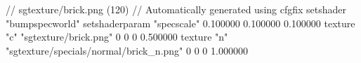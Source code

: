 // sgtexture/brick.png (120)
// Automatically generated using cfgfix
setshader "bumpspecworld"
setshaderparam "specscale" 0.100000 0.100000 0.100000
texture "c" "sgtexture/brick.png" 0 0 0 0.500000
texture "n" "sgtexture/specials/normal/brick_n.png" 0 0 0 1.000000
